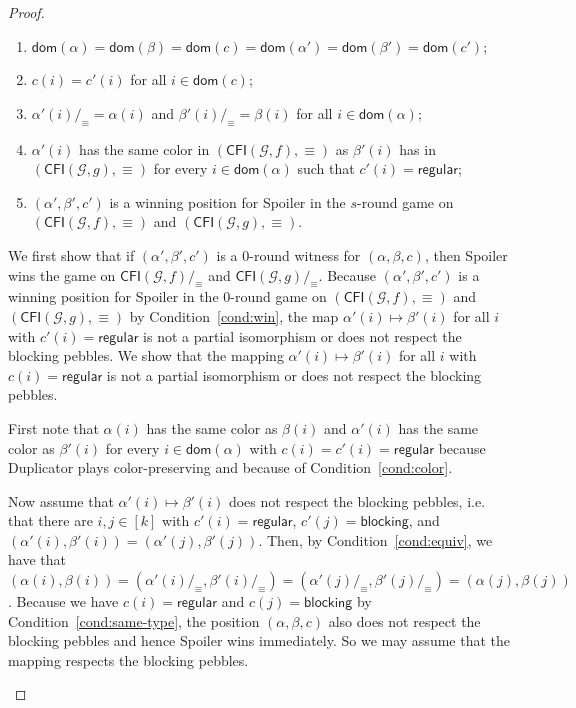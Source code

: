 \documentclass[a4paper,english, thm-restate]{lipics-v2021}
\newcommand{\regular}{\mathsf{regular}}
\newcommand{\blocking}{\mathsf{blocking}}
\newcommand{\comp}{\equiv}
\newcommand{\CFIsym}{\mathsf{CFI}}
\newcommand{\CFI}[1]{\CFIsym(#1)}
\newcommand{\compCFI}[2]{\CFI{#1}/_{#2}}
\newcommand{\precompCFI}[2]{{(\CFI{#1},#2)}}
\newcommand{\graphG}{\mathcal{G}}
\newcommand{\dom}{\mathsf{dom}}
\begin{document}
\begin{proof}
\begin{enumerate}
\begin{enumerate}
\item $\dom(\alpha) = \dom(\beta) =\dom(c) = \dom(\alpha') = \dom(\beta') = \dom(c')$;
                \item \label{cond:same-type} $c(i) = c'(i)$ for all $i\in\dom(c)$;
                \item \label{cond:equiv} $\alpha'(i)/_\comp = \alpha(i)$ and $\beta'(i)/_\comp = \beta(i)$ for all $i\in\dom(\alpha)$; 
                \item \label{cond:color} $\alpha'(i)$ has the same color in $\precompCFI{\graphG,f}{\comp}$ as $\beta'(i)$ has in $\precompCFI{\graphG,g}{\comp}$ for every $i \in  \dom(\alpha)$ such that $c'(i) = \regular$;
                \item \label{cond:win} $(\alpha', \beta', c')$ is a winning position for Spoiler in the $s$-round game on $\precompCFI{\graphG,f}{\comp}$ and $\precompCFI{\graphG,g}{\comp}$.
        \end{enumerate}
        We first show that if $(\alpha', \beta', c')$ is a $0$\nobreakdash-round witness for $(\alpha,\beta,c)$,
        then Spoiler wins the game on $\compCFI{\graphG,f}{\comp}$ and $\compCFI{\graphG,g}{\comp}$.
        Because $(\alpha', \beta', c')$ is a winning position for Spoiler in the $0$\nobreakdash-round game on $\precompCFI{\graphG,f}{\comp}$ and $\precompCFI{\graphG,g}{\comp}$
        by Condition~\ref{cond:win},
        the map $\alpha'(i) \mapsto \beta'(i)$ for all $i$ with $c'(i) =\regular$
        is not a partial isomorphism
        or does not respect the blocking pebbles.
        We show that the mapping
        $\alpha'(i) \mapsto \beta'(i)$ for all $i$ with $c(i) =\regular$
        is not a partial isomorphism
        or does not respect the blocking pebbles.
        
        First note that $\alpha(i)$ has the same color
        as $\beta(i)$
        and $\alpha'(i)$ has the same color as $\beta'(i)$
        for every $i \in \dom(\alpha)$ with $c(i)=c'(i) = \regular$
        because Duplicator plays color-preserving and because of Condition~\ref{cond:color}. 
        
        Now assume that $\alpha'(i) \mapsto \beta'(i)$ does not respect the blocking pebbles, i.e. that there are $i,j\in[k]$ with $c'(i) = \regular$, $c'(j) =\blocking$, and
        $(\alpha'(i),\beta'(i)) = (\alpha'(j), \beta'(j))$.
        Then, by Condition~\ref{cond:equiv},
        we have that $(\alpha(i),\beta(i)) = (\alpha'(i)/_\comp, \beta'(i)/_\comp)
        = (\alpha'(j)/_\comp, \beta'(j)/_\comp) = (\alpha(j),\beta(j))$.
        Because we have $c(i) = \regular$ and $c(j) = \blocking$
        by Condition~\ref{cond:same-type},
        the position $(\alpha,\beta,c)$ also does not respect the blocking pebbles
        and hence Spoiler wins immediately.
        So we may assume that the mapping respects the blocking pebbles.
        

\end{enumerate}
\end{proof}
\end{document}
